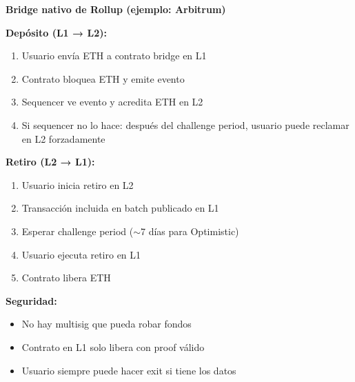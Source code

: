 \documentclass[11pt,a4paper,twoside,openright]{book}
\theoremstyle{definition}
\theoremstyle{plain}
\theoremstyle{remark}
\begin{document}
\begin{keyidea}
\textbf{Bridge nativo de Rollup (ejemplo: Arbitrum)}

\textbf{Depósito (L1 → L2):}
\begin{enumerate}
    \item Usuario envía ETH a contrato bridge en L1
    \item Contrato bloquea ETH y emite evento
    \item Sequencer ve evento y acredita ETH en L2
    \item Si sequencer no lo hace: después del challenge period, usuario puede reclamar en L2 forzadamente
\end{enumerate}

\textbf{Retiro (L2 → L1):}
\begin{enumerate}
    \item Usuario inicia retiro en L2
    \item Transacción incluida en batch publicado en L1
    \item Esperar challenge period ($\sim$7 días para Optimistic)
    \item Usuario ejecuta retiro en L1
    \item Contrato libera ETH
\end{enumerate}

\textbf{Seguridad:}
\begin{itemize}
    \item No hay multisig que pueda robar fondos
    \item Contrato en L1 solo libera con proof válido
    \item Usuario siempre puede hacer exit si tiene los datos
\end{itemize}
\end{keyidea}
\end{document}
